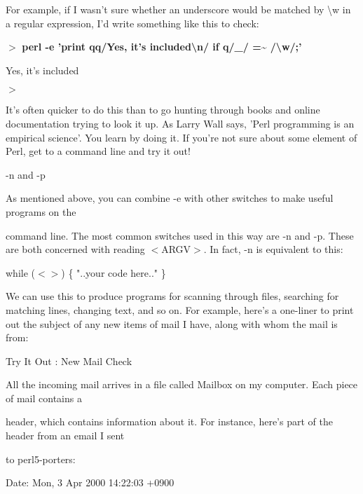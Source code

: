 \documentclass[a4paper,11pt]{book}
\begin{document}
\noindent 

\noindent For example, if I wasn't sure whether an underscore would be matched by \textbackslash w in a regular expression, I'd write something like this to check:

\noindent 

\noindent $>$ \textbf{perl -e 'print qq/Yes, it's included\textbackslash n/ if q/\_/ =\~{} /\textbackslash w/;'}

\noindent Yes, it's included

\noindent $>$

\noindent 

\noindent It's often quicker to do this than to go hunting through books and online documentation trying to look it up. As Larry Wall says, 'Perl programming is an empirical science'. You learn by doing it. If you're not sure about some element of Perl, get to a command line and try it out!

\noindent 

\noindent -n and -p

\noindent 

\noindent As mentioned above, you can combine -e with other switches to make useful programs on the

\noindent command line. The most common switches used in this way are -n and -p. These are both concerned with reading $<$ARGV$>$. In fact, -n is equivalent to this:

\noindent 

\noindent while ($<$$>$) \{ "..your code here.." \}

\noindent 

\noindent We can use this to produce programs for scanning through files, searching for matching lines, changing text, and so on. For example, here's a one-liner to print out the subject of any new items of mail I have, along with whom the mail is from:

\noindent 

\noindent Try It Out : New Mail Check

\noindent 

\noindent All the incoming mail arrives in a file called Mailbox on my computer. Each piece of mail contains a

\noindent header, which contains information about it. For instance, here's part of the header from an email I sent

\noindent to perl5-porters:

\noindent 

\noindent Date: Mon, 3 Apr 2000 14:22:03 +0900
\end{document}
